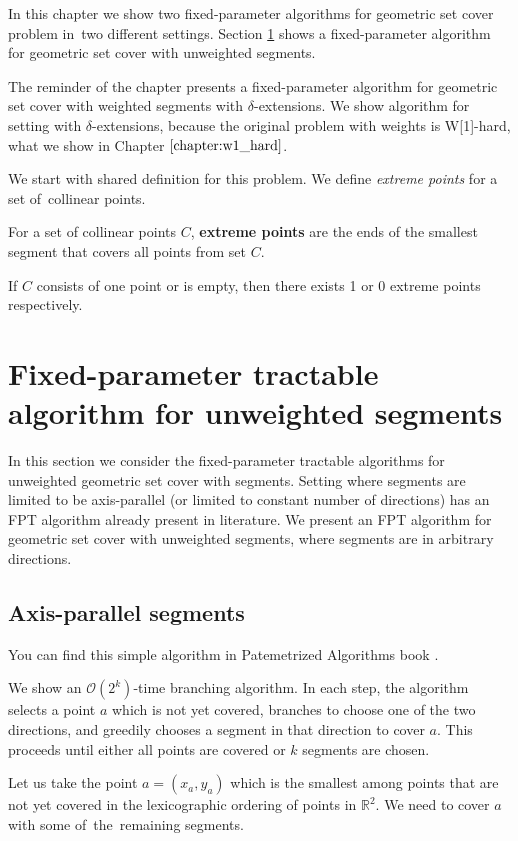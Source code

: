 In this chapter we show two fixed-parameter algorithms
for geometric set cover problem in~two different settings.
Section \ref{section:fpt_unweighted} shows 
a fixed-parameter algorithm for geometric set cover with unweighted segments.

The reminder of the chapter presents
a fixed-parameter algorithm for geometric set cover with weighted segments
with $\delta$-extensions. We show algorithm for setting with $\delta$-extensions,
because the original problem with weights is W[1]-hard,
what we show in Chapter $\ref{chapter:w1_hard}$.

We start with shared definition for this problem.
We define \textit{extreme points} for a set of~collinear points.

\begin{defi}
	For a set of collinear points $C$,
	\textbf{extreme points} are the ends
	of the smallest segment that covers all points from set $C$.
	
	If $C$ consists of one point or is empty, then
	there exists 1 or 0 extreme points respectively.
\end{defi}

\section{Fixed-parameter tractable algorithm for unweighted segments}
\label{section:fpt_unweighted}
In this section we consider the fixed-parameter tractable
algorithms for unweighted geometric set cover with segments.
Setting where segments are limited to be axis-parallel
(or limited to constant number of directions) has an FPT
algorithm already present in literature.
We present an FPT algorithm for geometric set cover
with unweighted segments, where segments are in arbitrary directions.

\subsection{Axis-parallel segments}
You can find this simple algorithm in Patemetrized Algorithms book \cite{platypus_book}.

We show an $\mathcal{O}(2^k)$-time branching algorithm.
In each step, the algorithm selects a point $a$ which is not yet covered,
branches to choose one of the two directions, and greedily chooses
a segment in that direction to cover $a$.
This proceeds until either all points are covered or $k$ segments are chosen.

Let us take
the point $a=(x_a,y_a)$ which is the smallest 
among points that are not yet covered
in the lexicographic ordering
of points in $\mathbb{R}^2$.
We need to cover $a$ with some of~the~remaining segments.

